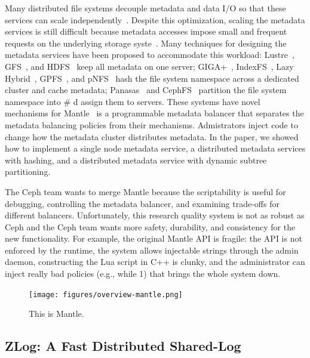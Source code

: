\documentclass[10pt,twocolumn]{article}
\begin{document}
Many distributed file systems decouple metadata and data I/O so that
these services can scale independently~\cite{alam:pdsw2011-metadata-scaling,ghemawat:sosp2003-gfs,hildebrand:msst2005-pnfs,weil_ceph_2006,welch:fast2008-panasas,shvachko:login2012-hdfs-scalability}. Despite
this optimization, scaling the metadata services is still difficult
because metadata accesses impose small and frequent requests on the
underlying storage syste~\cite{roselli:atec2000-FS-workloads}. Many
techniques for designing the metadata services have been proposed to
accommodate this workload: Lustre~\cite{konstantinos:pdsw2014-lustre-metadata}, GFS~\cite{ghemawat:sosp2003-gfs}, and HDFS~\cite{shvachko:login2012-hdfs-scalability} keep all metadata on one
server; GIGA+~\cite{patil:fast2011-giga}, IndexFS~\cite{ren:sc2014-indexfs}, Lazy Hybrid~\cite{brandt:msst2003-lh}, GPFS~\cite{schmuck:fast2002-gpfs},
and pNFS~\cite{hildebrand:supercomputing2006-pNFS} hash the file
system namespace across a dedicated cluster and cache metadata; Panasas~\cite{welch:fast2008-panasas} and CephFS~\cite{weil:sc2004-dyn-metadata} partition the file system namespace
into \# d assign them to servers. These systems have novel mechanisms
for Mantle~\cite{sevilla:sc15-mantle} is a programmable metadata
balancer that separates the metadata balancing policies from their
mechanisms. Admistrators inject code to change how the metadata cluster
distributes metadata. In the paper, we showed how to implement a single
node metadata service, a distributed metadata services with hashing, and
a distributed metadata service with dynamic subtree partitioning.

The Ceph team wants to merge Mantle because the scriptability is useful
for debugging, controlling the metadata balancer, and examining
trade-offs for different balancers. Unfortunately, this research quality
system is not as robust as Ceph and the Ceph team wants more safety,
durability, and consistency for the new functionality. For example, the
original Mantle API is fragile: the API is not enforced by the runtime,
the system allows injectable strings through the admin daemon,
constructing the Lua script in C++ is clunky, and the administrator can
inject really bad policies (e.g., while 1) that brings the whole system
down.

\begin{figure}[htbp]
\centering
\texttt{[image: figures/overview-mantle.png]}
\caption{This is Mantle.}
\end{figure}

\subsection{ZLog: A Fast Distributed Shared-Log}
\end{document}
